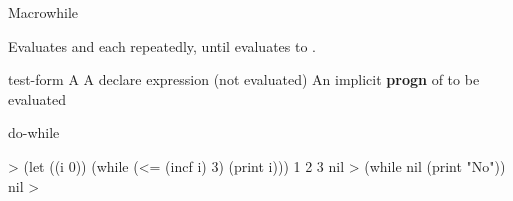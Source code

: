 \documentclass[10pt,twoside,english,pdftex]{article}
\begin{document}

\begin{functiondoc}{Macro}{while}{ 
    }
%
  
\fnsyntax

\fnpurpose Evaluates  and each 
repeatedly, until  evaluates to \nil.

\fnpackage {}

\fnmodule {}

\fnargs
\begin{args}{test-form}
 A 
\arg[declaration] A declare expression (not evaluated)
\arg[forms] An implicit \textbf{progn} of  to be evaluated
\end{args}

\begin{alsos}{do-while}
\also[do-until]
\also[do-while]
\also[until]
\end{alsos}

\fnexamples
%
\W\supp
\begin{example}
  > (let ((i 0)) 
      (while (<= (incf i) 3) 
         (print i)))
  1 
  2 
  3 
  nil\goodpagebreak
  > (while nil (print "No"))
  nil
  >
\end{example}

\end{functiondoc}

\end{document}
